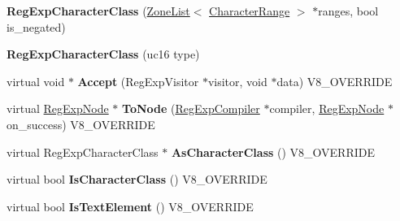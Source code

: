 \begin{DoxyCompactItemize}
\item 
\hypertarget{classv8_1_1internal_1_1_v8___f_i_n_a_l_ab4bcee9309f70f2b4befbbeeb7dce8ff}{}{\bfseries Reg\+Exp\+Character\+Class} (\hyperlink{classv8_1_1internal_1_1_zone_list}{Zone\+List}$<$ \hyperlink{classv8_1_1internal_1_1_character_range}{Character\+Range} $>$ $\ast$ranges, bool is\+\_\+negated)\label{classv8_1_1internal_1_1_v8___f_i_n_a_l_ab4bcee9309f70f2b4befbbeeb7dce8ff}

\item 
\hypertarget{classv8_1_1internal_1_1_v8___f_i_n_a_l_a0936874d79826e0b42e8628c6331f86d}{}{\bfseries Reg\+Exp\+Character\+Class} (uc16 type)\label{classv8_1_1internal_1_1_v8___f_i_n_a_l_a0936874d79826e0b42e8628c6331f86d}

\item 
\hypertarget{classv8_1_1internal_1_1_v8___f_i_n_a_l_a5a421cb811caf33f244ce08fe3e5ac14}{}virtual void $\ast$ {\bfseries Accept} (Reg\+Exp\+Visitor $\ast$visitor, void $\ast$data) V8\+\_\+\+O\+V\+E\+R\+R\+I\+D\+E\label{classv8_1_1internal_1_1_v8___f_i_n_a_l_a5a421cb811caf33f244ce08fe3e5ac14}

\item 
\hypertarget{classv8_1_1internal_1_1_v8___f_i_n_a_l_aa183d4adede0c6af0c092eeebf59c194}{}virtual \hyperlink{classv8_1_1internal_1_1_reg_exp_node}{Reg\+Exp\+Node} $\ast$ {\bfseries To\+Node} (\hyperlink{classv8_1_1internal_1_1_reg_exp_compiler}{Reg\+Exp\+Compiler} $\ast$compiler, \hyperlink{classv8_1_1internal_1_1_reg_exp_node}{Reg\+Exp\+Node} $\ast$on\+\_\+success) V8\+\_\+\+O\+V\+E\+R\+R\+I\+D\+E\label{classv8_1_1internal_1_1_v8___f_i_n_a_l_aa183d4adede0c6af0c092eeebf59c194}

\item 
\hypertarget{classv8_1_1internal_1_1_v8___f_i_n_a_l_ac6f3620b18ed59c241263b96e2df92a5}{}virtual Reg\+Exp\+Character\+Class $\ast$ {\bfseries As\+Character\+Class} () V8\+\_\+\+O\+V\+E\+R\+R\+I\+D\+E\label{classv8_1_1internal_1_1_v8___f_i_n_a_l_ac6f3620b18ed59c241263b96e2df92a5}

\item 
\hypertarget{classv8_1_1internal_1_1_v8___f_i_n_a_l_a834ff000e3bf8c541d5768eb6b88a501}{}virtual bool {\bfseries Is\+Character\+Class} () V8\+\_\+\+O\+V\+E\+R\+R\+I\+D\+E\label{classv8_1_1internal_1_1_v8___f_i_n_a_l_a834ff000e3bf8c541d5768eb6b88a501}

\item 
\hypertarget{classv8_1_1internal_1_1_v8___f_i_n_a_l_a74df85cf747c0d931e5c99ae7831685f}{}virtual bool {\bfseries Is\+Text\+Element} () V8\+\_\+\+O\+V\+E\+R\+R\+I\+D\+E\label{classv8_1_1internal_1_1_v8___f_i_n_a_l_a74df85cf747c0d931e5c99ae7831685f}


\end{DoxyCompactItemize}

